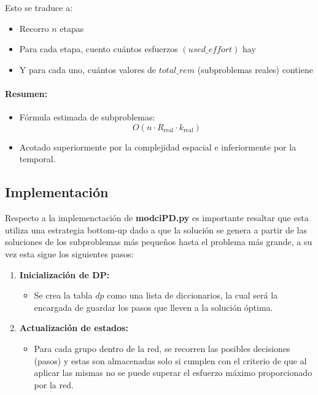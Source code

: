 \documentclass[11pt,letter]{article}
\begin{document}
\begin{itemize}
Esto se traduce a:
\begin{itemize}
    \item Recorro $n$ etapas
    \item Para cada etapa, cuento cuántos esfuerzos $(used\_effort)$ hay
    \item Y para cada uno, cuántos valores de $total\_rem$ (subproblemas reales) contiene
\end{itemize}

\paragraph{Resumen:}
\begin{itemize}
    \item Fórmula estimada de subproblemas:
    \[
        O(n \cdot R_{\text{real}} \cdot k_{\text{real}})
    \]
    \item Acotado superiormente por la complejidad espacial e inferiormente por la temporal.
\end{itemize}



\subsection{Implementación}
Respecto a la implemenctación de \textbf{modciPD.py} es importante resaltar que esta utiliza una estrategia bottom-up dado a que la solución se genera  a partir de las soluciones de los subproblemas más pequeños hasta el problema más grande, a su vez esta sigue los siguientes pasos:
\begin{enumerate}

\item \textbf{Inicialización de DP:}
\begin{itemize}
    \item Se crea la tabla $dp$ como una lista de diccionarios, la cual será la encargada de guardar los pasos que lleven a la solución óptima.

\end{itemize}

\item \textbf{Actualización de estados:}
\begin{itemize}
    \item Para cada grupo dentro de la red, se recorren las posibles decisiones (pasos) y estas son almacenadas solo si cumplen con el criterio de que al aplicar las mismas no se puede superar el esfuerzo máximo proporcionado por la red.
\end{itemize}


\end{enumerate}
\end{itemize}
\end{document}
